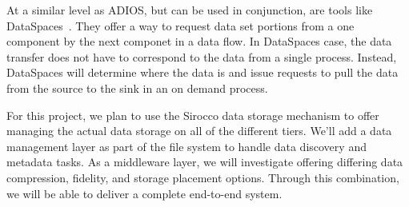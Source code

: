 At a similar level as ADIOS, but can be used in conjunction, are tools like
DataSpaces~\cite{dataspaces}. They offer a way to request data set portions
from a one component by the next componet in a data flow. In DataSpaces case,
the data transfer does not have to correspond to the data from a single
process.  Instead, DataSpaces will determine where the data is and issue
requests to pull the data from the source to the sink in an on demand process.

For this project, we plan to use the Sirocco data storage mechanism to
offer managing the actual data storage on all of the different tiers. We'll add
a data management layer as part of the file system to handle data discovery and
metadata tasks. As a middleware layer, we will investigate offering differing
data compression, fidelity, and storage placement options. Through this 
combination, we will be able to deliver a complete end-to-end system.

